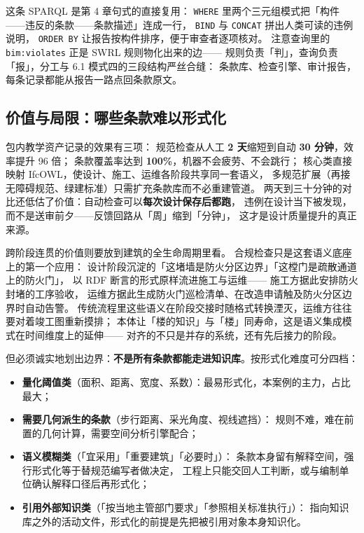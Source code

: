

这条 SPARQL 是第 4 章句式的直接复用：
\texttt{WHERE} 里两个三元组模式把「构件——违反的条款——条款描述」连成一行，
\texttt{BIND} 与 \texttt{CONCAT} 拼出人类可读的违例说明，
\texttt{ORDER BY} 让报告按构件排序，便于审查者逐项核对。
注意查询里的 \texttt{bim:violates} 正是 SWRL 规则物化出来的边——
规则负责「判」，查询负责「报」，分工与 6.1 模式四的三段结构严丝合缝：
条款库、检查引擎、审计报告，每条记录都能从报告一路点回条款原文。

\subsection{价值与局限：哪些条款难以形式化}

包内教学资产记录的效果有三项：
规范检查从人工 \textbf{2 天}缩短到自动 \textbf{30 分钟}，效率提升 96 倍；
条款覆盖率达到 \textbf{100\%}，机器不会疲劳、不会跳行；
核心类直接映射 IfcOWL，使设计、施工、运维各阶段共享同一套语义，
多规范扩展（再接无障碍规范、绿建标准）只需扩充条款库而不必重建管道。
两天到三十分钟的对比还低估了价值：自动检查可以\textbf{每次设计保存后都跑}，
违例在设计当下被发现，而不是送审前夕——反馈回路从「周」缩到「分钟」，
这才是设计质量提升的真正来源。

跨阶段连贯的价值则要放到建筑的全生命周期里看。
合规检查只是这套语义底座上的第一个应用：
设计阶段沉淀的「这堵墙是防火分区边界」「这樘门是疏散通道上的防火门」，
以 RDF 断言的形式原样流进施工与运维——
施工方据此安排防火封堵的工序验收，
运维方据此生成防火门巡检清单、在改造申请触及防火分区边界时自动告警。
传统流程里这些语义在阶段交接时随格式转换湮灭，运维方往往要对着竣工图重新摸排；
本体让「楼的知识」与「楼」同寿命，这是语义集成模式在时间维度上的延伸——
对齐的不只是并存的系统，还有先后接力的阶段。

但必须诚实地划出边界：\textbf{不是所有条款都能走进知识库}。按形式化难度可分四档：
\begin{itemize}
\item \textbf{量化阈值类}（面积、距离、宽度、系数）：最易形式化，本案例的主力，占比最大；
\item \textbf{需要几何派生的条款}（步行距离、采光角度、视线遮挡）：
  规则不难，难在前置的几何计算，需要空间分析引擎配合；
\item \textbf{语义模糊类}（「宜采用」「重要建筑」「必要时」）：
  条款本身留有解释空间，强行形式化等于替规范编写者做决定，
  工程上只能交回人工判断，或与编制单位确认解释口径后再形式化；
\item \textbf{引用外部知识类}（「按当地主管部门要求」「参照相关标准执行」）：
  指向知识库之外的活动文件，形式化的前提是先把被引用对象本身知识化。
\end{itemize}

